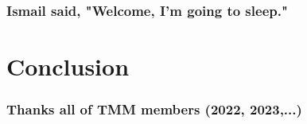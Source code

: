 \documentclass[aspectratio=169]{beamer}
\begin{document}
\begin{frame}
\frametitle{Ismail said, "Welcome, I'm going to sleep."}
\begin{center}

\end{center}
\end{frame}

\section{Conclusion}
\begin{frame}
\frametitle{Thanks all of TMM members (2022, 2023,...)}
\begin{center}

\end{center}
\end{frame}
\end{document}
